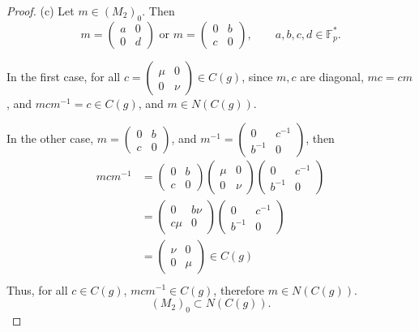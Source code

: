 \documentclass[11pt,a4paper]{article}
\newcommand{\F}{\mathbb{F}}
\begin{document}
{\begin{proof}
\item[(c)] Let $m \in(M_2)_0$. Then 
$$m = \begin{pmatrix} a& 0 \\ 0 & d \end{pmatrix} \text{ or }m = \begin{pmatrix} 0& b\\  c & 0 \end{pmatrix}, \qquad a,b,c,d \in \F_p^*.$$

In the first case, for all $c = \begin{pmatrix} \mu & 0 \\ 0 & \nu \end{pmatrix} \in C(g)$,  since $m,c$ are diagonal, $mc= cm$, and $mcm^{-1} = c \in C(g)$, and $m \in N(C(g))$.

In the other case, $m = \begin{pmatrix} 0& b\\  c & 0 \end{pmatrix}$, and $m^{-1} =   \begin{pmatrix} 0& c^{-1}\\  b^{-1} & 0 \end{pmatrix}$, then
\begin{align*}
mcm^{-1} &= \begin{pmatrix} 0& b\\  c & 0 \end{pmatrix} \begin{pmatrix} \mu & 0 \\ 0 & \nu \end{pmatrix} \begin{pmatrix} 0& c^{-1}\\  b^{-1} & 0 \end{pmatrix}\\
&=\begin{pmatrix} 0& b\nu\\  c\mu & 0 \end{pmatrix}\begin{pmatrix} 0& c^{-1}\\  b^{-1} & 0 \end{pmatrix}\\
&=\begin{pmatrix} \nu & 0\\  0 & \mu \end{pmatrix} \in C(g)\\
\end{align*}
Thus, for all $c \in C(g)$, $mcm^{-1} \in C(g)$, therefore $m \in N(C(g))$.
$$(M_2)_0 \subset N(C(g)).$$
\end{proof}

}
\end{document}
